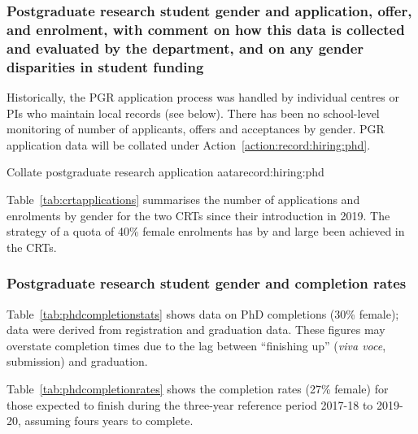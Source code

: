 \subsubsection{Postgraduate research student gender and application, offer, and enrolment, with comment on how this data is collected and evaluated by the department, and on any gender disparities in student funding}
\label{sec:phdnumbers}


Historically, the PGR application process was handled by individual 
centres or PIs who maintain local 
records (see below). There has been no school-level  monitoring of number of applicants, offers 
and acceptances by gender. PGR application data will be collated under
Action~\ref{action:record:hiring:phd}.

\begin{actionblock}{\ksspace{}Collate postgraduate research application aata}{record:hiring:phd}
\acttrackgenderinfophd
\hfill{
\hypersetup{hidelinks}
\hyperlink{aa0}{\gotoactionsymbol{}
}}
\end{actionblock}

Table~\ref{tab:crtapplications} summarises the
number of applications and enrolments by gender for the two CRTs
since their introduction in 2019. 
The strategy of a quota of 40\% female enrolments has by and large been achieved in the CRTs.









\subsubsection{Postgraduate research student gender and completion rates}

Table~\ref{tab:phdcompletionstats} shows data on
PhD completions (30\% female);
data were derived from
registration and graduation data.  
These figures may overstate completion 
times due to the
lag between ``finishing up'' (\emph{viva voce}, submission) 
and graduation.



Table~\ref{tab:phdcompletionrates} shows the completion rates (27\% female) 
for those expected to finish during the three-year reference 
period 2017-18 to 2019-20, assuming fours years to complete.

